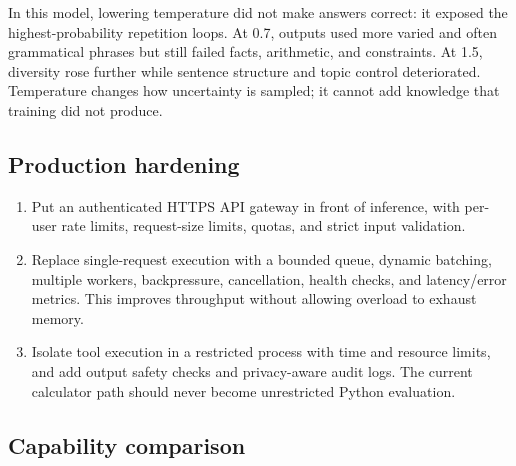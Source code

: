 \documentclass{article}
\begin{document}
In this model, lowering temperature did not make answers correct: it exposed
the highest-probability repetition loops. At 0.7, outputs used more varied and
often grammatical phrases but still failed facts, arithmetic, and constraints.
At 1.5, diversity rose further while sentence structure and topic control
deteriorated. Temperature changes how uncertainty is sampled; it cannot add
knowledge that training did not produce.

\subsection{Production hardening}

\begin{enumerate}
\item Put an authenticated HTTPS API gateway in front of inference, with
per-user rate limits, request-size limits, quotas, and strict input validation.
\item Replace single-request execution with a bounded queue, dynamic batching,
multiple workers, backpressure, cancellation, health checks, and latency/error
metrics. This improves throughput without allowing overload to exhaust memory.
\item Isolate tool execution in a restricted process with time and resource
limits, and add output safety checks and privacy-aware audit logs. The current
calculator path should never become unrestricted Python evaluation.
\end{enumerate}

\subsection{Capability comparison}

\begin{table}[ht]
\centering
\small
\caption{Published comparisons. Stentor uses normalized ARC accuracy and
zero-shot GSM8K; Qwen uses ARC accuracy and five-shot GSM8K.}
\label{tab:task4-comparison}
\end{table}
\end{document}
